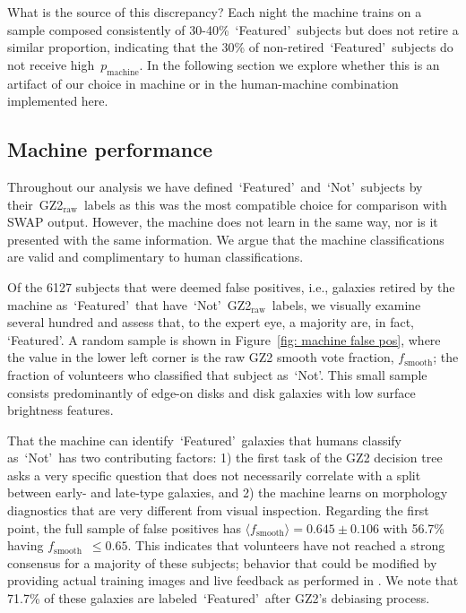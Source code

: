 \documentclass[twocolumn]{aastex6}
\newcommand{\feat}{`Featured'}
\newcommand{\notfeat}{`Not'}
\newcommand{\raw}{GZ2$_{\text{raw}}$}
\newcommand{\pmachine}{$p_{\mathrm{machine}}$}
\newcommand{\fsmooth}{$f_{\mathrm{smooth}}$}
\begin{document}
What is the source of this discrepancy? 
Each night the machine trains on a sample composed consistently of 30-40\%~\feat~subjects but does not retire a similar proportion, indicating
that the 30\% of non-retired~\feat~subjects do not receive high~\pmachine. 
In the following section we explore whether this is an artifact of our choice in machine 
or in the human-machine combination implemented here. 



\subsection{Machine performance}\label{sec: machine performance}

Throughout our analysis we have defined~\feat~and~\notfeat~subjects by 
their~\raw~labels as this was the most compatible choice for comparison with SWAP output.  
However, the machine does not learn in the same way, nor is it presented with the 
same information. We argue that the machine classifications are valid 
and complimentary to human classifications. 

Of the 6127 subjects that were deemed false positives, i.e., galaxies retired by the 
machine as~\feat~that have~\notfeat~\raw~labels, we visually examine several hundred
and assess that, to the expert eye, a majority are, in fact, \feat.  
A random sample is shown in Figure~\ref{fig: machine false pos}, where the value 
in the lower left corner is the raw GZ2 smooth vote fraction, \fsmooth; 
the fraction of volunteers who classified that subject as~\notfeat. 
This small sample consists predominantly of edge-on disks and disk 
galaxies with low surface brightness features. 

That the machine can identify~\feat~galaxies that humans classify 
as~\notfeat~has two contributing factors: 
1) the first task of the GZ2 decision tree asks a very specific question that 
does not necessarily correlate with a split between early- and late-type galaxies, and 
 2) the machine learns on morphology diagnostics that are very different from visual inspection. 
Regarding the first point, the full sample of false positives has $\langle f_{\mathrm{smooth}} \rangle = 0.645 \pm 0.106$  with 56.7\%  having \fsmooth~$\le 0.65$. This indicates that volunteers have not 
reached a strong consensus for a majority of these subjects; behavior that could 
be modified by providing actual training images and live feedback as performed in \cite{Marshall2016}. 
We note that 71.7\% of these galaxies are labeled~\feat~after GZ2's debiasing process. 
\end{document}
